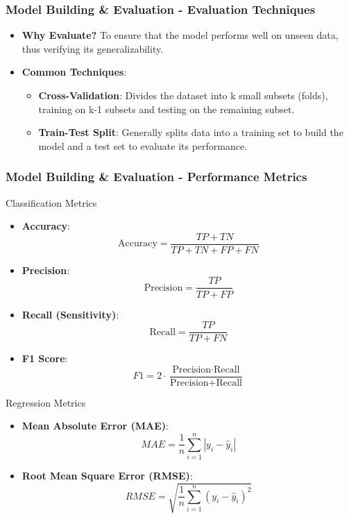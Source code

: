 \documentclass{beamer}
\begin{document}
\begin{frame}[fragile]
    \frametitle{Model Building \& Evaluation - Evaluation Techniques}
    \begin{itemize}
        \item \textbf{Why Evaluate?} To ensure that the model performs well on unseen data, thus verifying its generalizability.
        \item \textbf{Common Techniques}:
        \begin{itemize}
            \item \textbf{Cross-Validation}: Divides the dataset into k small subsets (folds), training on k-1 subsets and testing on the remaining subset.
            \item \textbf{Train-Test Split}: Generally splits data into a training set to build the model and a test set to evaluate its performance.
        \end{itemize}
    \end{itemize}
\end{frame}

\begin{frame}[fragile]
    \frametitle{Model Building \& Evaluation - Performance Metrics}
    \begin{block}{Classification Metrics}
        \begin{itemize}
            \item \textbf{Accuracy}: 
            \[
            \text{Accuracy} = \frac{TP + TN}{TP + TN + FP + FN}
            \]
            \item \textbf{Precision}: 
            \[
            \text{Precision} = \frac{TP}{TP + FP}
            \]
            \item \textbf{Recall (Sensitivity)}: 
            \[
            \text{Recall} = \frac{TP}{TP + FN}
            \]
            \item \textbf{F1 Score}: 
            \[
            F1 = 2 \cdot \frac{\text{Precision} \cdot \text{Recall}}{\text{Precision} + \text{Recall}}
            \]
        \end{itemize}
    \end{block}

    \begin{block}{Regression Metrics}
        \begin{itemize}
            \item \textbf{Mean Absolute Error (MAE)}: 
            \[
            MAE = \frac{1}{n} \sum_{i=1}^n |y_i - \hat{y}_i|
            \]
            \item \textbf{Root Mean Square Error (RMSE)}: 
            \[
            RMSE = \sqrt{\frac{1}{n} \sum_{i=1}^n (y_i - \hat{y}_i)^2}
            \]
        \end{itemize}
    \end{block}
\end{frame}
\end{document}
